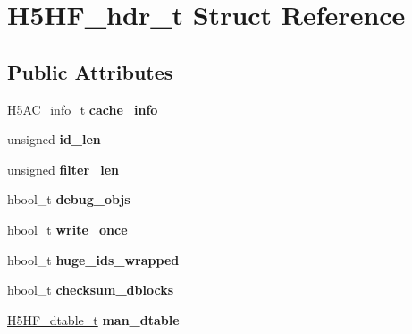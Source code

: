 \hypertarget{struct_h5_h_f__hdr__t}{}\section{H5\+H\+F\+\_\+hdr\+\_\+t Struct Reference}
\label{struct_h5_h_f__hdr__t}
\subsection*{Public Attributes}
\begin{DoxyCompactItemize}
\item 
\mbox{\label{struct_h5_h_f__hdr__t_abcc276b0059ba558e4077424230bc11e}} 
H5\+A\+C\+\_\+info\+\_\+t {\bfseries cache\+\_\+info}
\item 
\mbox{\label{struct_h5_h_f__hdr__t_ac2cec7cad8eb55447847687d4d031730}} 
unsigned {\bfseries id\+\_\+len}
\item 
\mbox{\label{struct_h5_h_f__hdr__t_a914fa1eb147874ccafb72bb933874f89}} 
unsigned {\bfseries filter\+\_\+len}
\item 
\mbox{\label{struct_h5_h_f__hdr__t_ae24ee9f2ad922ccffa5aeaa10eef55d7}} 
hbool\+\_\+t {\bfseries debug\+\_\+objs}
\item 
\mbox{\label{struct_h5_h_f__hdr__t_a1175ad8a9d3afdea5dea1b06de915fdd}} 
hbool\+\_\+t {\bfseries write\+\_\+once}
\item 
\mbox{\label{struct_h5_h_f__hdr__t_a283022af0287c2e548ae8d7436a9cc33}} 
hbool\+\_\+t {\bfseries huge\+\_\+ids\+\_\+wrapped}
\item 
\mbox{\label{struct_h5_h_f__hdr__t_a096007c28631b2148d1b8189b6a2518a}} 
hbool\+\_\+t {\bfseries checksum\+\_\+dblocks}
\item 
\mbox{\label{struct_h5_h_f__hdr__t_a8ffacfa2ec57e6986efceb805e8f4f59}} 
\hyperlink{struct_h5_h_f__dtable__t}{H5\+H\+F\+\_\+dtable\+\_\+t} {\bfseries man\+\_\+dtable}
\item 
\mbox{\label{struct_h5_h_f__hdr__t_a06d531395ef833465785d82800a79840}} 

\end{DoxyCompactItemize}
